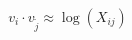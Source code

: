 \documentclass[preview]{standalone}
\begin{document}
\begin{align*}
v_i \cdot v_{\tilde{j}} \approx \log(X_{ij})
\end{align*}
\end{document}
